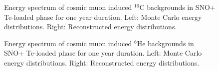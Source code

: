 \begin{figure}[htbp]
	\caption{Energy spectrum of cosmic muon induced $^{10}$C backgrounds in SNO+ Te-loaded phase for one year duration. Left: Monte Carlo energy distributions. Right: Reconstructed energy distributions.}
	\label{muon_c10}
\end{figure}

\begin{figure}[htbp]
	\caption{Energy spectrum of cosmic muon induced $^{6}$He backgrounds in SNO+ Te-loaded phase for one year duration. Left: Monte Carlo energy distributions. Right: Reconstructed energy distributions.}
	\label{muon_He6}
\end{figure}

